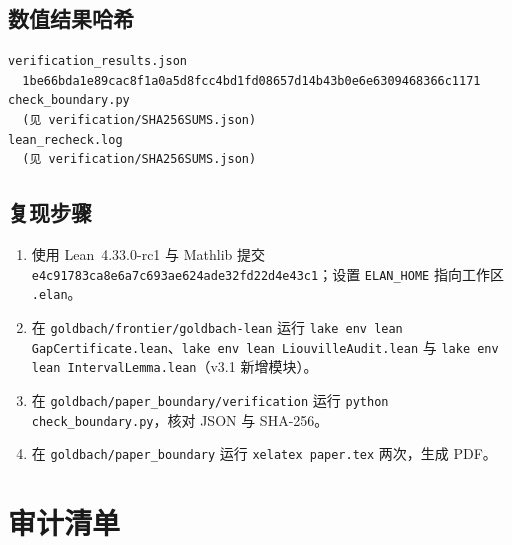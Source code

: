 \documentclass[11pt,a4paper]{ctexart}
\theoremstyle{plain}
\theoremstyle{definition}
\begin{document}
\subsection*{数值结果哈希}

\begin{verbatim}
verification_results.json
  1be66bda1e89cac8f1a0a5d8fcc4bd1fd08657d14b43b0e6e6309468366c1171
check_boundary.py
  (见 verification/SHA256SUMS.json)
lean_recheck.log
  (见 verification/SHA256SUMS.json)
\end{verbatim}

\subsection*{复现步骤}

\begin{enumerate}
\item 使用 Lean~4.33.0-rc1 与 Mathlib 提交 \texttt{e4c91783ca8e6a7c693ae624ade32fd22d4e43c1}；设置 \texttt{ELAN\_HOME} 指向工作区 \texttt{.elan}。
\item 在 \texttt{goldbach/frontier/goldbach-lean} 运行 \texttt{lake env lean GapCertificate.lean}、\texttt{lake env lean LiouvilleAudit.lean} 与 \texttt{lake env lean IntervalLemma.lean}（v3.1 新增模块）。
\item 在 \texttt{goldbach/paper\_boundary/verification} 运行 \texttt{python check\_boundary.py}，核对 JSON 与 SHA-256。
\item 在 \texttt{goldbach/paper\_boundary} 运行 \texttt{xelatex paper.tex} 两次，生成 PDF。
\end{enumerate}

\section{审计清单}
\label{app:checklist}
\end{document}

